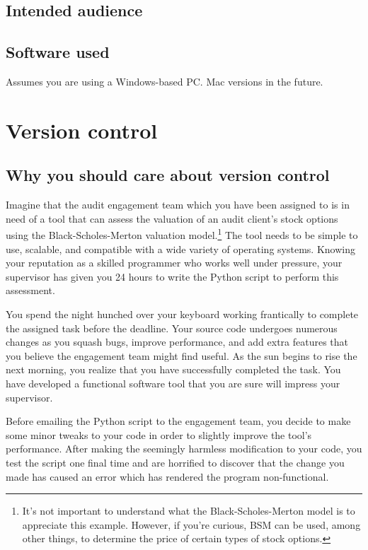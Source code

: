 \documentclass{book}
\begin{document}
\section{Intended audience}
\section{Software used}
Assumes you are using a Windows-based PC. Mac versions in the future.


\chapter{Version control}
\section{Why you should care about version control}

Imagine that the audit engagement team which you have been assigned to is in need of a tool that can assess the valuation of an audit client's stock options using the Black-Scholes-Merton valuation model.\footnote{It's not important to understand what the Black-Scholes-Merton model is to appreciate this example. However, if you're curious, BSM can be used, among other things, to determine the price of certain types of stock options.} The tool needs to be simple to use, scalable, and compatible with a wide variety of operating systems. Knowing your reputation as a skilled programmer who works well under pressure, your supervisor has given you 24 hours to write the Python script to perform this assessment.

You spend the night hunched over your keyboard working frantically to complete the assigned task before the deadline. Your source code undergoes numerous changes as you squash bugs, improve performance, and add extra features that you believe the engagement team might find useful. As the sun begins to rise the next morning, you realize that you have successfully completed the task. You have developed a functional software tool that you are sure will impress your supervisor. 

Before emailing the Python script to the engagement team, you decide to make some minor tweaks to your code in order to slightly improve the tool's performance. After making the seemingly harmless modification to your code, you test the script one final time and are horrified to discover that the change you made has caused an error which has rendered the program non-functional.
\end{document}
